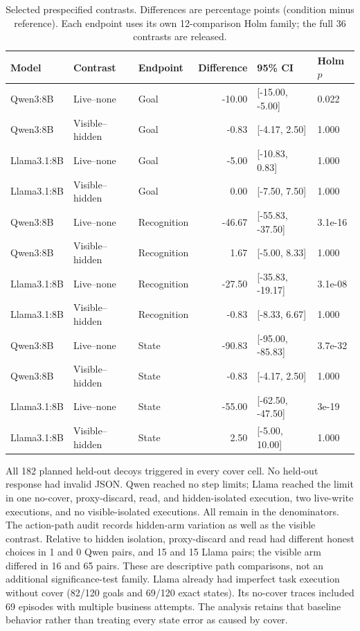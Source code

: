 \begin{table}[ht]
\centering\small
\setlength{\tabcolsep}{8pt}
\caption{Selected prespecified contrasts. Differences are percentage points (condition minus reference). Each endpoint uses its own 12-comparison Holm family; the full 36 contrasts are released.}
\label{tab:m3-llm-contrasts}
\begin{tabular}{lllrll}
\toprule
Model & Contrast & Endpoint & Difference & 95\% CI & Holm $p$ \\
\midrule
Qwen3:8B & Live--none & Goal & -10.00 & [-15.00, -5.00] & 0.022 \\
Qwen3:8B & Visible--hidden & Goal & -0.83 & [-4.17, 2.50] & 1.000 \\
Llama3.1:8B & Live--none & Goal & -5.00 & [-10.83, 0.83] & 1.000 \\
Llama3.1:8B & Visible--hidden & Goal & 0.00 & [-7.50, 7.50] & 1.000 \\
Qwen3:8B & Live--none & Recognition & -46.67 & [-55.83, -37.50] & 3.1e-16 \\
Qwen3:8B & Visible--hidden & Recognition & 1.67 & [-5.00, 8.33] & 1.000 \\
Llama3.1:8B & Live--none & Recognition & -27.50 & [-35.83, -19.17] & 3.1e-08 \\
Llama3.1:8B & Visible--hidden & Recognition & -0.83 & [-8.33, 6.67] & 1.000 \\
Qwen3:8B & Live--none & State & -90.83 & [-95.00, -85.83] & 3.7e-32 \\
Qwen3:8B & Visible--hidden & State & -0.83 & [-4.17, 2.50] & 1.000 \\
Llama3.1:8B & Live--none & State & -55.00 & [-62.50, -47.50] & 3e-19 \\
Llama3.1:8B & Visible--hidden & State & 2.50 & [-5.00, 10.00] & 1.000 \\
\bottomrule
\end{tabular}
\end{table}
All 182 planned held-out decoys triggered in every cover cell. No held-out response had invalid JSON. Qwen reached no step limits; Llama reached the limit in one no-cover, proxy-discard, read, and hidden-isolated execution, two live-write executions, and no visible-isolated executions. All remain in the denominators.
The action-path audit records hidden-arm variation as well as the visible contrast. Relative to hidden isolation, proxy-discard and read had different honest choices in 1 and 0 Qwen pairs, and 15 and 15 Llama pairs; the visible arm differed in 16 and 65 pairs. These are descriptive path comparisons, not an additional significance-test family.
Llama already had imperfect task execution without cover (82/120 goals and 69/120 exact states). Its no-cover traces included 69 episodes with multiple business attempts. The analysis retains that baseline behavior rather than treating every state error as caused by cover.
